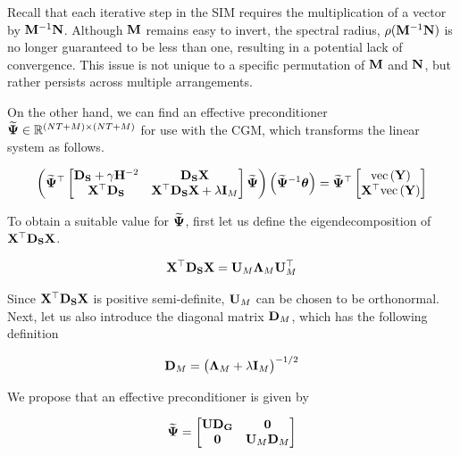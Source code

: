 Recall that each iterative step in the SIM requires the multiplication of a vector by $\mathbf{M}^{-1}\mathbf{N}$. Although $\mathbf{M}$ remains easy to invert, the spectral radius, $\rho(\mathbf{M}^{-1}\mathbf{N})$ is no longer guaranteed to be less than one, resulting in a potential lack of convergence. This issue is not unique to a specific permutation of $\mathbf{M}$ and $\mathbf{N}$, but rather persists across multiple arrangements. 

On the other hand, we can find an effective preconditioner $\widetilde{\mathbf{\Psi}}  \in \mathbb{R}^{(NT + M) \times (NT + M)}$ for use with the CGM, which transforms the linear system as follows. 

\begin{equation}
    \left( \widetilde{\mathbf{\Psi}}^\top \begin{bmatrix}
        \mathbf{D}_{\mathbf{S}} + \gamma \mathbf{H}^{-2} & \mathbf{D}_{\mathbf{S}}  \mathbf{X} \\
        \mathbf{X}^\top \mathbf{D}_{\mathbf{S}} & \mathbf{X}^\top \mathbf{D}_{\mathbf{S}} \mathbf{X} + \lambda \mathbf{I}_M   
       \end{bmatrix}  \widetilde{\mathbf{\Psi}} \right) \left( \widetilde{\mathbf{\Psi}}^{-1} \boldsymbol{\theta} \right)   = \widetilde{\mathbf{\Psi}}^\top \begin{bmatrix} \text{\textup{vec}}\left(\mathbf{Y}\right) \\ \mathbf{X}^\top \text{\textup{vec}}\left(\mathbf{Y}\right) \end{bmatrix}
\end{equation}


To obtain a suitable value for $\widetilde{\mathbf{\Psi}}$, first let us define the eigendecomposition of $\mathbf{X}^\top\mathbf{D}_{\mathbf{S}} \mathbf{X}$. 

\begin{equation}
    \mathbf{X}^\top\mathbf{D}_{\mathbf{S}} \mathbf{X} = \mathbf{U}_M \mathbf{\Lambda}_M \mathbf{U}_M^\top
\end{equation}

Since $\mathbf{X}^\top\mathbf{D}_{\mathbf{S}} \mathbf{X}$ is positive semi-definite, $\mathbf{U}_M$ can be chosen to be orthonormal. Next, let us also introduce the diagonal matrix $\mathbf{D}_M$, which has the following definition 

\begin{equation}
    \mathbf{D}_M = \big(\mathbf{\Lambda}_M + \lambda \mathbf{I}_M \big)^{-1/2}
\end{equation}

We propose that an effective preconditioner is given by 

\begin{equation}
    \widetilde{\mathbf{\Psi}} =  \begin{bmatrix}
        \mathbf{U} \mathbf{D}_{\mathbf{G}} & \mathbf{0} \\
        \mathbf{0} & \mathbf{U}_M \mathbf{D}_M 
    \end{bmatrix}
\end{equation}


